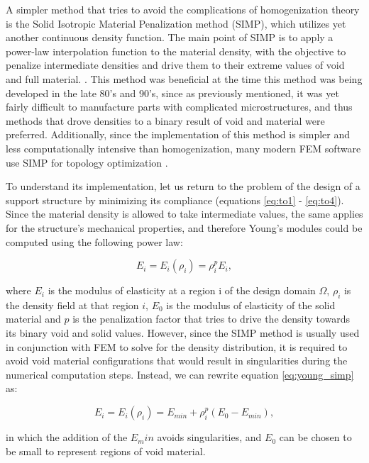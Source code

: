 \documentclass[../main.tex]{subfiles}
\begin{document}
A simpler method that tries to avoid the complications of homogenization theory is the Solid Isotropic Material Penalization method (SIMP), which utilizes yet another continuous density function. The main point of SIMP is to apply a power-law interpolation function to the material density, with the objective to penalize intermediate densities and drive them to their extreme values of void and full material. \cite{bendsoeOptimalShapeDesign1989} \cite{rozvanyGeneralizedShapeOptimization1992}. This method was beneficial at the time this method was being developed in the late 80's and 90's, since as previously mentioned, it was yet fairly difficult to manufacture parts with complicated microstructures, and thus methods that drove densities to a binary result of void and material were preferred. Additionally, since the implementation of this method is simpler and less computationally intensive than homogenization, many modern FEM software use SIMP for topology optimization \cite{SIMPMethodTopologyb}.

To understand its implementation, let us return to the problem of the design of a support structure by minimizing its compliance (equations \ref{eq:to1} - \ref{eq:to4}). Since the material density is allowed to take intermediate values, the same applies for the structure's mechanical properties, and therefore Young's modules could be computed using the following power law:

\begin{equation}
  E_i = E_i(\rho_i) = \rho^p_i E_i,
  \label{eq:young_simp}
\end{equation}

where $E_i$ is the modulus of elasticity at a region i of the design domain $\Omega$, $\rho_i$ is the density field at that region $i$, $E_0$ is the modulus of elasticity of the solid material and $p$ is the penalization factor that tries to drive the density towards its binary void and solid values. However, since the SIMP method is usually used in conjunction with FEM to solve for the density distribution, it is required to avoid void material configurations that would result in singularities during the numerical computation steps. Instead, we can rewrite equation \ref{eq:young_simp} as:

\begin{equation}
  E_i = E_i(\rho_i) = E_{min} + \rho_i^p (E_0 - E_{min}),
  \label{eq:simp_modified}
\end{equation}

in which the addition of the $E_min$ avoids singularities, and $E_0$ can be chosen to be small to represent regions of void material.
\end{document}
